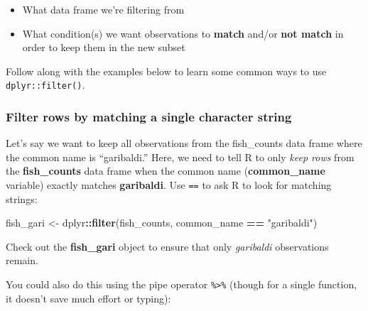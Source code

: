 \documentclass[]{book}
\newenvironment{Shaded}{\begin{snugshade}}{\end{snugshade}}
\newcommand{\KeywordTok}[1]{\textcolor[rgb]{0.13,0.29,0.53}{\textbf{#1}}}
\newcommand{\NormalTok}[1]{#1}
\newcommand{\OperatorTok}[1]{\textcolor[rgb]{0.81,0.36,0.00}{\textbf{#1}}}
\newcommand{\StringTok}[1]{\textcolor[rgb]{0.31,0.60,0.02}{#1}}
\providecommand{\tightlist}{%
  \setlength{\itemsep}{0pt}\setlength{\parskip}{0pt}}
\begin{document}
\begin{itemize}
\tightlist
\item
  What data frame we're filtering from
\item
  What condition(s) we want observations to \textbf{match} and/or \textbf{not match} in order to keep them in the new subset
\end{itemize}

Follow along with the examples below to learn some common ways to use \texttt{dplyr::filter()}.

\hypertarget{filter-rows-by-matching-a-single-character-string}{%
\subsubsection{Filter rows by matching a single character string}\label{filter-rows-by-matching-a-single-character-string}}

Let's say we want to keep all observations from the fish\_counts data frame where the common name is ``garibaldi.'' Here, we need to tell R to only \emph{keep rows} from the \textbf{fish\_counts} data frame when the common name (\textbf{common\_name} variable) exactly matches \textbf{garibaldi}.
Use \texttt{==} to ask R to look for matching strings:

\begin{Shaded}
\begin{Highlighting}[]
\NormalTok{fish_gari <-}\StringTok{ }\NormalTok{dplyr}\OperatorTok{::}\KeywordTok{filter}\NormalTok{(fish_counts, common_name }\OperatorTok{==}\StringTok{ "garibaldi"}\NormalTok{)}
\end{Highlighting}
\end{Shaded}

Check out the \textbf{fish\_gari} object to ensure that only \emph{garibaldi} observations remain.

You could also do this using the pipe operator \texttt{\%\textgreater{}\%} (though for a single function, it doesn't save much effort or typing):

\begin{Shaded}
\end{Shaded}
\end{document}
